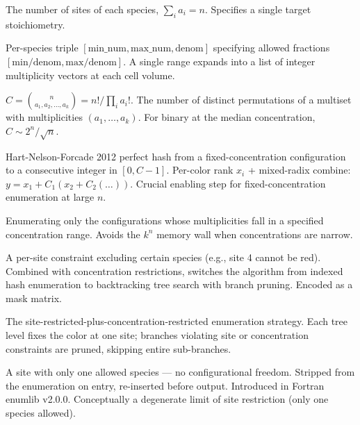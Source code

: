\documentclass[11pt]{article}
\begin{document}
\begin{description}[leftmargin=2em, style=nextline]
\item[Concentration / multiplicity vector $(a_1, \ldots, a_k)$]
The number of sites of each species, $\sum_i a_i = n$. Specifies a single
target stoichiometry.

\item[Concentration range]
Per-species triple $[\text{min\_num}, \text{max\_num}, \text{denom}]$
specifying allowed fractions $[\text{min}/\text{denom}, \text{max}/\text{denom}]$.
A single range expands into a list of integer multiplicity vectors at
each cell volume.

\item[Multinomial coefficient $C$]
$C = \binom{n}{a_1, a_2, \ldots, a_k} = n! / \prod_i a_i!$. The number
of distinct permutations of a multiset with multiplicities $(a_1, \ldots, a_k)$.
For binary at the median concentration, $C \sim 2^n / \sqrt{n}$.

\item[Multiset / mixed-radix hash]
Hart-Nelson-Forcade 2012 perfect hash from a fixed-concentration
configuration to a consecutive integer in $[0, C-1]$. Per-color rank
$x_i$ + mixed-radix combine: $y = x_1 + C_1 (x_2 + C_2 (\ldots))$.
Crucial enabling step for fixed-concentration enumeration at large $n$.

\item[Concentration-restricted enumeration]
Enumerating only the configurations whose multiplicities fall in a
specified concentration range. Avoids the $k^n$ memory wall when
concentrations are narrow.

\item[Site restriction]
A per-site constraint excluding certain species (e.g., site 4 cannot
be red). Combined with concentration restrictions, switches the
algorithm from indexed hash enumeration to backtracking tree search
with branch pruning. Encoded as a mask matrix.

\item[Backtracking tree search]
The site-restricted-plus-concentration-restricted enumeration
strategy. Each tree level fixes the color at one site; branches
violating site or concentration constraints are pruned, skipping
entire sub-branches.

\item[Inactive / spectator site]
A site with only one allowed species --- no configurational freedom.
Stripped from the enumeration on entry, re-inserted before output.
Introduced in Fortran enumlib v2.0.0. Conceptually a degenerate
limit of site restriction (only one species allowed).


\end{description}
\end{document}
